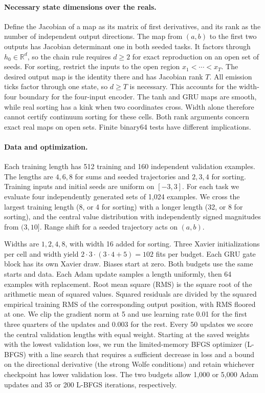 \paragraph{Necessary state dimensions over the reals.}
Define the Jacobian of a map as its matrix of first derivatives, and its rank as the number of independent output directions. The map from \((a,b)\) to the first two outputs has Jacobian determinant one in both seeded tasks. It factors through \(h_0\in\mathbb R^d\), so the chain rule requires \(d\ge2\) for exact reproduction on an open set of seeds. For sorting, restrict the inputs to the open region \(x_1<\cdots<x_T\). The desired output map is the identity there and has Jacobian rank \(T\). All emission ticks factor through one state, so \(d\ge T\) is necessary. This accounts for the width-four boundary for the four-input encoder. The tanh and GRU maps are smooth, while real sorting has a kink when two coordinates cross. Width alone therefore cannot certify continuum sorting for these cells. Both rank arguments concern exact real maps on open sets. Finite binary64 tests have different implications.

\paragraph{Data and optimization.}
Each training length has 512 training and 160 independent validation examples. The lengths are \(4,6,8\) for sums and seeded trajectories and \(2,3,4\) for sorting. Training inputs and initial seeds are uniform on \([-3,3]\). For each task we evaluate four independently generated sets of 1,024 examples. We cross the largest training length (8, or 4 for sorting) with a longer length (32, or 8 for sorting), and the central value distribution with independently signed magnitudes from \((3,10]\). Range shift for a seeded trajectory acts on \((a,b)\).

Widths are \(1,2,4,8\), with width 16 added for sorting. Three Xavier initializations per cell and width yield \(2\cdot3\cdot(3\cdot4+5)=102\) fits per budget. Each GRU gate block has its own Xavier draw. Biases start at zero. Both budgets use the same starts and data. Each Adam update samples a length uniformly, then 64 examples with replacement. Root mean square (RMS) is the square root of the arithmetic mean of squared values. Squared residuals are divided by the squared empirical training RMS of the corresponding output position, with RMS floored at one. We clip the gradient norm at 5 and use learning rate 0.01 for the first three quarters of the updates and 0.003 for the rest. Every 50 updates we score the central validation lengths with equal weight. Starting at the saved weights with the lowest validation loss, we run the limited-memory BFGS optimizer (L-BFGS) with a line search that requires a sufficient decrease in loss and a bound on the directional derivative (the strong Wolfe conditions) and retain whichever checkpoint has lower validation loss. The two budgets allow 1,000 or 5,000 Adam updates and 35 or 200 L-BFGS iterations, respectively.

